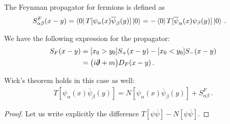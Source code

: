 \documentclass[main.tex]{subfiles}
\begin{document}
\begin{definition}
The Feynman propagator for fermions is defined as 
%
\begin{align}
S^{F}_{\alpha \beta } (x-y)
&= \bra{0}T[\psi_{\alpha }(x) \overline{\psi}_{\beta }(y)] \ket{0}
= - \bra{0} T[\overline{\psi}_\alpha (x) \psi_{\beta }(y)] \ket{0}
\,.
\end{align}
\end{definition}

\begin{claim}
We have the following expression for the propagator: 
%
\begin{align}
S_F(x-y) &= [x_0 > y_0 ] S_+ (x-y) - [x_0 < y_0 ] S_- (x-y)  \\
&= \qty(i \slashed{\partial} + m) D_F (x-y)
\,.
\end{align}
\end{claim}


\begin{claim}
Wick's theorem holds in this case as well: 
%
\begin{align}
T[\psi_{\alpha }(x) \overline{\psi}_{\beta }(y)]
= N [\psi_{\alpha }(x) \overline{\psi}_{\beta }(y)]
+ S^{F}_{\alpha \beta }
\,.
\end{align}
\end{claim}

\begin{proof}
Let us write explicitly the difference \(T[\psi \overline{\psi}] - N[\psi \overline{\psi}]\). 
\end{proof}
\end{document}
